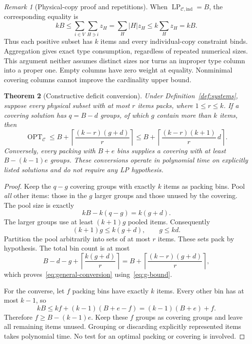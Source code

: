 \documentclass[11pt,a4paper]{article}
\newtheorem{theorem}{Theorem}
\theoremstyle{definition}
\theoremstyle{remark}
\newtheorem{remark}[theorem]{Remark}
\newcommand{\OPT}{\operatorname{OPT}}
\newcommand{\LP}{\operatorname{LP}}
\newcommand{\ceil}[1]{\left\lceil #1\right\rceil}
\newcommand{\cC}{\mathcal C}
\begin{document}
\begin{remark}[Physical-copy proof and repetitions]\label{rem:copies}
When $\LP_{\cC,\mathrm{ind}}=B$, the corresponding equality is
\[
 kB\le\sum_{i\in V}\sum_{H\ni i}z_H
 =\sum_H|H|z_H\le k\sum_Hz_H=kB.
\]
Thus each positive subset has $k$ items and every individual-copy constraint binds. Aggregation gives exact type consumption, regardless of repeated numerical sizes. This argument neither assumes distinct sizes nor turns an improper type column into a proper one. Empty columns have zero weight at equality. Nonminimal covering columns cannot improve the cardinality upper bound.
\end{remark}

\begin{theorem}[Constructive deficit conversion]\label{thm:conversion}
Under Definition~\ref{def:systems}, suppose every physical subset with at most $r$ items packs, where $1\le r\le k$. If a covering solution has $q=B-d$ groups, of which $g$ contain more than $k$ items, then
\begin{equation}\label{eq:general-conversion}
 \OPT_{\cC}\le B+\ceil{\frac{(k-r)(g+d)}r}
 \le B+\ceil{\frac{(k-r)(k+1)}r\,d}.
\end{equation}
Conversely, every packing with $B+e$ bins supplies a covering with at least $B-(k-1)e$ groups. These conversions operate in polynomial time on explicitly listed solutions and do not require any LP hypothesis.
\end{theorem}
\begin{proof}
Keep the $q-g$ covering groups with exactly $k$ items as packing bins. Pool \emph{all} other items: those in the $g$ larger groups and those unused by the covering. The pool size is exactly
\begin{equation}\label{eq:pool-size}
 kB-k(q-g)=k(g+d).
\end{equation}
The larger groups use at least $(k+1)g$ pooled items. Consequently
\begin{equation}\label{eq:g-bound}
 (k+1)g\le k(g+d),\qquad g\le kd.
\end{equation}
Partition the pool arbitrarily into sets of at most $r$ items. These sets pack by hypothesis. The total bin count is at most
\[
 B-d-g+\ceil{\frac{k(g+d)}r}
 =B+\ceil{\frac{(k-r)(g+d)}r},
\]
which proves~\eqref{eq:general-conversion} using~\eqref{eq:g-bound}.

For the converse, let $f$ packing bins have exactly $k$ items. Every other bin has at most $k-1$, so
\[
 kB\le kf+(k-1)(B+e-f)=(k-1)(B+e)+f.
\]
Therefore $f\ge B-(k-1)e$. Keep these $f$ groups as covering groups and leave all remaining items unused. Grouping or discarding explicitly represented items takes polynomial time. No test for an optimal packing or covering is involved.
\end{proof}
\end{document}
